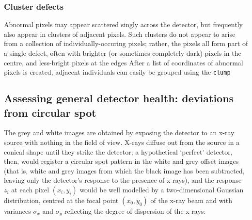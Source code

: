 \documentclass[\main/IO-Pixels.tex]{subfiles}
\begin{document}
\subsubsection{Cluster defects}
Abnormal pixels may appear scattered singly across the detector, but frequently also appear in clusters of adjacent pixels. Such clusters do not appear to arise from a collection of individually-occuring pixels; rather, the pixels all form part of a single defect, often with brighter (or sometimes completely dark) pixels in the centre, and less-bright pixels at the edges  After a list of coordinates of abnormal pixels is created, adjacent individuals can easily be grouped using the \texttt{clump} 





\subsection{Assessing general detector health: deviations from circular spot}


The grey and white images are obtained by exposing the detector to an x-ray source with nothing in the field of view. X-rays diffuse out from the source in a conical shape until they strike the detector; a hypothetical `perfect' detector,  then, would register a circular spot pattern in the white and grey offset images (that is, white and grey images from which the black image has been subtracted, leaving only the detector's response to the presence of x-rays), and the response $z_i$ at each pixel $(x_i, y_i)$ would be well modelled by a two-dimensional Gaussian distribution, centred at the focal point $(x_0, y_0)$ of the x-ray beam and with variances $\sigma_x$ and $\sigma_y$ reflecting the degree of dispersion of the x-rays:
\end{document}
